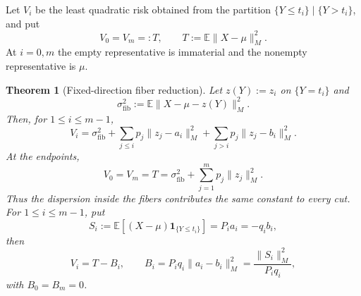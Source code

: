 \documentclass[a4paper]{amsart}
\numberwithin{equation}{section}
\newtheorem{theorem}{Theorem}[section]
\theoremstyle{remark}
\newcommand{\1}{\mathbf 1}
\begin{document}
Let $V_i$ be the least quadratic risk obtained from the partition
$\{Y\leq t_i\}\mid\{Y>t_i\}$, and put
\[
  V_0=V_m=:T,
  \qquad
  T:=\mathbb E\|X-\mu\|_M^2.
\]
At $i=0,m$ the empty representative is immaterial and the nonempty
representative is $\mu$.

\begin{theorem}[Fixed-direction fiber reduction]
\label{thm:fiber-reduction}
Let $z(Y):=z_i$ on $\{Y=t_i\}$ and
\[
  \sigma^2_{\mathrm{fib}}
  :=\mathbb E\|X-\mu-z(Y)\|_M^2.
\]
Then, for $1\leq i\leq m-1$,
\begin{equation}\label{eq:fiber-decomposition}
  V_i=\sigma^2_{\mathrm{fib}}
      +\sum_{j\leq i}p_j\|z_j-a_i\|_M^2
      +\sum_{j>i}p_j\|z_j-b_i\|_M^2.
\end{equation}
At the endpoints,
\[
 V_0=V_m=T=\sigma^2_{\mathrm{fib}}+\sum_{j=1}^m p_j\|z_j\|_M^2.
\]
Thus the dispersion inside the fibers contributes the same constant to every
cut.  For $1\leq i\leq m-1$, put
\[
  S_i:=\mathbb E[(X-\mu)\mathbf 1_{\{Y\leq t_i\}}]
      =P_i a_i=-q_i b_i,
\]
then
\begin{equation}\label{eq:vector-gain}
  V_i=T-B_i,
  \qquad
  B_i=P_iq_i\|a_i-b_i\|_M^2
     =\frac{\|S_i\|_M^2}{P_iq_i},
\end{equation}
with $B_0=B_m=0$.
\end{theorem}
\end{document}
